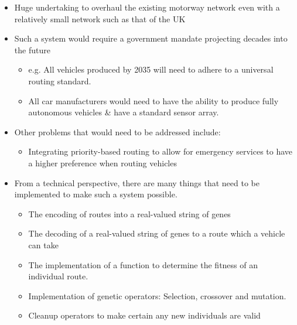 \documentclass{beamer}
\begin{document}
\begin{frame}

    \begin{itemize}
        \item Huge undertaking to overhaul the existing motorway network even with a relatively small network such as that of the UK
        \item Such a system would require a government mandate projecting decades into the future
            \begin{itemize}
                \item e.g. All vehicles produced by 2035 will need to adhere to a universal routing standard.
                \item All car manufacturers would need to have the ability to produce fully autonomous vehicles \& have a standard sensor array.
            \end{itemize}
        \item Other problems that would need to be addressed include:
            \begin{itemize}
                \item Integrating priority-based routing to allow for emergency services to have a higher preference when routing vehicles
            \end{itemize}
    \end{itemize}
\end{frame}
\begin{frame}
    \begin{itemize}
        \item From a technical perspective, there are many things that need to be implemented to make such a system possible. 
            \begin{itemize}
                \item The encoding of routes into a real-valued string of genes
                \item The decoding of a real-valued string of genes to a route which a vehicle can take
                \item The implementation of a function to determine the fitness of an individual route. 
                \item Implementation of genetic operators: Selection, crossover and mutation.
                \item Cleanup operators to make certain any new individuals are valid
            \end{itemize}
    \end{itemize}

\end{frame}
\end{document}
